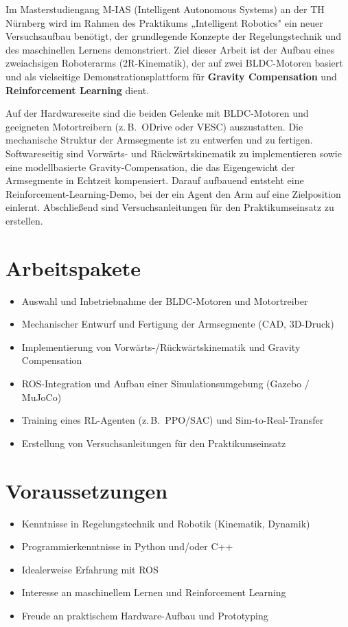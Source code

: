 \documentclass{ohm_project_description}
\begin{document}
\maketitle
\thispagestyle{fancy}

Im Masterstudiengang M-IAS (Intelligent Autonomous Systems) an der TH Nürnberg wird im Rahmen des Praktikums „Intelligent Robotics" ein neuer Versuchsaufbau benötigt, der grundlegende Konzepte der Regelungstechnik und des maschinellen Lernens demonstriert. Ziel dieser Arbeit ist der Aufbau eines zweiachsigen Roboterarms (2R-Kinematik), der auf zwei BLDC-Motoren basiert und als vielseitige Demonstrationsplattform für \textbf{Gravity Compensation} und \textbf{Reinforcement Learning} dient.

Auf der Hardwareseite sind die beiden Gelenke mit BLDC-Motoren und geeigneten Motortreibern (z.\,B.\ ODrive oder VESC) auszustatten. Die mechanische Struktur der Armsegmente ist zu entwerfen und zu fertigen. Softwareseitig sind Vorwärts- und Rückwärtskinematik zu implementieren sowie eine modellbasierte Gravity-Compensation, die das Eigengewicht der Armsegmente in Echtzeit kompensiert. Darauf aufbauend entsteht eine Reinforcement-Learning-Demo, bei der ein Agent den Arm auf eine Zielposition einlernt. Abschließend sind Versuchsanleitungen für den Praktikumseinsatz zu erstellen.

\section*{Arbeitspakete}
\begin{itemize}[leftmargin=0.5cm]
    \setlength\itemsep{.1em}
    \item Auswahl und Inbetriebnahme der BLDC-Motoren und Motortreiber
    \item Mechanischer Entwurf und Fertigung der Armsegmente (CAD, 3D-Druck)
    \item Implementierung von Vorwärts-/Rückwärtskinematik und Gravity Compensation
    \item ROS-Integration und Aufbau einer Simulationsumgebung (Gazebo / MuJoCo)
    \item Training eines RL-Agenten (z.\,B.\ PPO/SAC) und Sim-to-Real-Transfer
    \item Erstellung von Versuchsanleitungen für den Praktikumseinsatz
\end{itemize}

\section*{Voraussetzungen}
\begin{itemize}[leftmargin=0.5cm]
    \setlength\itemsep{.1em}
    \item Kenntnisse in Regelungstechnik und Robotik (Kinematik, Dynamik)
    \item Programmierkenntnisse in Python und/oder C++
    \item Idealerweise Erfahrung mit ROS
    \item Interesse an maschinellem Lernen und Reinforcement Learning
    \item Freude an praktischem Hardware-Aufbau und Prototyping
\end{itemize}
\end{document}
